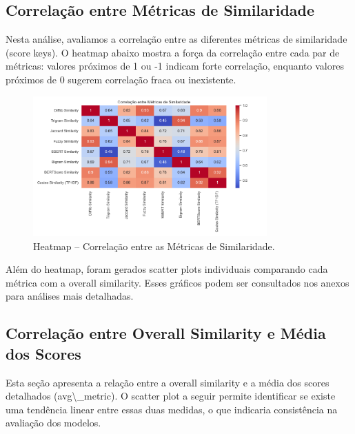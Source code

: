 \documentclass{article}%
\begin{document}
%
\subsection*{Correlação entre Métricas de Similaridade}%
\label{subsec:CorrelaoentreMtricasdeSimilaridade}%
Nesta análise, avaliamos a correlação entre as diferentes métricas de similaridade (score keys). O heatmap abaixo mostra a força da correlação entre cada par de métricas: valores próximos de 1 ou {-}1 indicam forte correlação, enquanto valores próximos de 0 sugerem correlação fraca ou inexistente.%


\begin{figure}[H]%
\centering%
\includegraphics[width=0.8\textwidth]{analysis_results/heatmap_score_keys_correlation.png}%
\caption{Heatmap – Correlação entre as Métricas de Similaridade.}%
\end{figure}

%
\newline%
Além do heatmap, foram gerados scatter plots individuais comparando cada métrica com a overall similarity. Esses gráficos podem ser consultados nos anexos para análises mais detalhadas.

%
\subsection*{Correlação entre Overall Similarity e Média dos Scores}%
\label{subsec:CorrelaoentreOverallSimilarityeMdiadosScores}%
Esta seção apresenta a relação entre a overall similarity e a média dos scores detalhados (avg\textbackslash{}\_metric). O scatter plot a seguir permite identificar se existe uma tendência linear entre essas duas medidas, o que indicaria consistência na avaliação dos modelos.%
\end{document}
